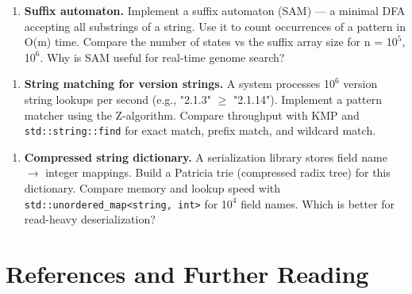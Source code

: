 \begin{enumerate}
\item \textbf{Suffix automaton.} Implement a suffix automaton (SAM) — a minimal DFA accepting all substrings of a string. Use it to count occurrences of a pattern in O(m) time. Compare the number of states vs the suffix array size for n = 1$0^{5}$, 1$0^{6}$. Why is SAM useful for real-time genome search?
\end{enumerate}

\begin{enumerate}
\item \textbf{String matching for version strings.} A system processes 1$0^{6}$ version string lookups per second (e.g., "2.1.3" $\ge $ "2.1.14"). Implement a pattern matcher using the Z-algorithm. Compare throughput with KMP and \texttt{std::string::find} for exact match, prefix match, and wildcard match.
\end{enumerate}

\begin{enumerate}
\item \textbf{Compressed string dictionary.} A serialization library stores field name $\to $ integer mappings. Build a Patricia trie (compressed radix tree) for this dictionary. Compare memory and lookup speed with \texttt{std::unordered\_map<string, int>} for 1$0^{4}$ field names. Which is better for read-heavy deserialization?
\end{enumerate}

\section{References and Further Reading}

